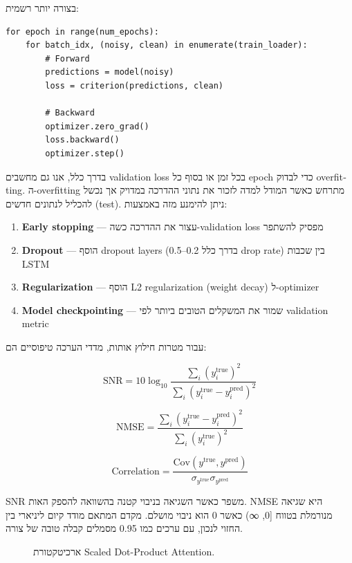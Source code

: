 בצורה יותר רשמית:

\begin{LTR}
\begin{verbatim}
for epoch in range(num_epochs):
    for batch_idx, (noisy, clean) in enumerate(train_loader):
        # Forward
        predictions = model(noisy)
        loss = criterion(predictions, clean)
        
        # Backward
        optimizer.zero_grad()
        loss.backward()
        optimizer.step()
\end{verbatim}
\end{LTR}

בדרך כלל, אנו גם מחשבים \textenglish{validation loss} בכל זמן או בסוף כל epoch כדי לבדוק \textenglish{overfitting}. ה-overfitting מתרחש כאשר המודל למדה לזכור את נתוני ההדרכה במדויק אך נכשל להכליל לנתונים חדשים (test). ניתן להימנע מזה באמצעות:

\begin{enumerate}
\item \textbf{Early stopping} --- עצור את ההדרכה כשה-validation loss מפסיק להשתפר
\item \textbf{Dropout} --- הוסף dropout layers (בדרך כלל 0.2--0.5 drop rate) בין שכבות LSTM
\item \textbf{Regularization} --- הוסף L2 regularization (weight decay) ל-optimizer
\item \textbf{Model checkpointing} --- שמור את המשקלים הטובים ביותר לפי validation metric
\end{enumerate}

עבור מטרות חילוץ אותות, מדדי הערכה טיפוסיים הם:

\begin{equation}
\text{SNR} = 10 \log_{10} \frac{\sum_i (y_i^{\text{true}})^2}{\sum_i (y_i^{\text{true}} - y_i^{\text{pred}})^2}
\end{equation}

\begin{equation}
\text{NMSE} = \frac{\sum_i (y_i^{\text{true}} - y_i^{\text{pred}})^2}{\sum_i (y_i^{\text{true}})^2}
\end{equation}

\begin{equation}
\text{Correlation} = \frac{\text{Cov}(y^{\text{true}}, y^{\text{pred}})}{\sigma_{y^{\text{true}}} \sigma_{y^{\text{pred}}}}
\end{equation}

SNR משפר כאשר השגיאה בניבוי קטנה בהשוואה להספק האות. NMSE היא שגיאה מנורמלת בטווח [0, ∞) כאשר 0 הוא ניבוי מושלם. מקדם המתאם מודד קיום ליניארי בין החזוי לנכון, עם ערכים כמו 0.95 מסמלים קבלה טובה של צורה.\begin{figure}[htbp]
    \centering
    
    \caption{ארכיטקטורת \textenglish{Scaled Dot-Product Attention}.}
    \label{fig:sdp_attention}
\end{figure}
